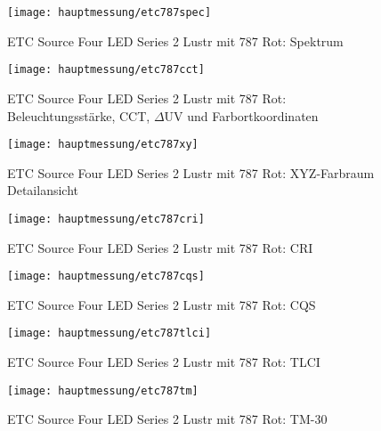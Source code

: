 \documentclass[pagesize,paper=A4,fontsize=12pt,utf8,numbers=noenddot,bibliography=totoc,listof=totoc,DIV=11,BCOR=1mm]{scrreprt}
\begin{document}
\begin{figure}[htp]     %
\centering
\texttt{[image: hauptmessung/etc787spec]} 
\caption {ETC Source Four LED Series 2 Lustr mit 787 Rot: Spektrum} 
\end{figure}

\begin{figure}[htp]     %
\centering
\texttt{[image: hauptmessung/etc787cct]} 
\caption {ETC Source Four LED Series 2 Lustr mit 787 Rot: Beleuchtungsstärke, CCT, $\Delta$UV und Farbortkoordinaten} 
\end{figure}

\begin{figure}[htp]     %
\centering
\texttt{[image: hauptmessung/etc787xy]} 
\caption {ETC Source Four LED Series 2 Lustr mit 787 Rot: XYZ-Farbraum Detailansicht} 
\end{figure}

\begin{figure}[htp]     %
\centering
\texttt{[image: hauptmessung/etc787cri]} 
\caption {ETC Source Four LED Series 2 Lustr mit 787 Rot: CRI} 
\end{figure}

\begin{figure}[htp]     %
\centering
\texttt{[image: hauptmessung/etc787cqs]} 
\caption {ETC Source Four LED Series 2 Lustr mit 787 Rot: CQS} 
\end{figure}

\begin{figure}[htp]     %
\centering
\texttt{[image: hauptmessung/etc787tlci]} 
\caption {ETC Source Four LED Series 2 Lustr mit 787 Rot: TLCI} 
\end{figure}

\begin{figure}[htp]     %
\centering
\texttt{[image: hauptmessung/etc787tm]} 
\caption {ETC Source Four LED Series 2 Lustr mit 787 Rot: TM-30} 
\end{figure}
\end{document}
